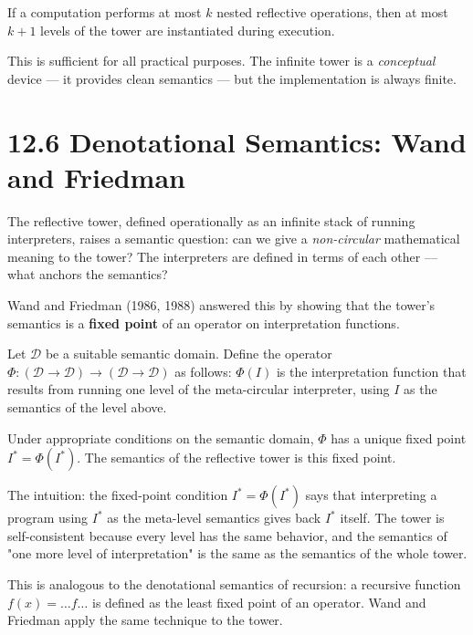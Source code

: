 \begin{proposition}
If a computation performs at most $k$ nested reflective operations, then at most $k + 1$ levels of the tower are instantiated during execution.

This is sufficient for all practical purposes. The infinite tower is a \textit{conceptual} device --- it provides clean semantics --- but the implementation is always finite.
\end{proposition}

\section{12.6 Denotational Semantics: Wand and Friedman}

The reflective tower, defined operationally as an infinite stack of running interpreters, raises a semantic question: can we give a \textit{non-circular} mathematical meaning to the tower? The interpreters are defined in terms of each other --- what anchors the semantics?

Wand and Friedman (1986, 1988) answered this by showing that the tower's semantics is a \textbf{fixed point} of an operator on interpretation functions.

\begin{definition}
Let $\mathcal{D}$ be a suitable semantic domain. Define the operator $\Phi: (\mathcal{D} \to \mathcal{D}) \to (\mathcal{D} \to \mathcal{D})$ as follows: $\Phi(I)$ is the interpretation function that results from running one level of the meta-circular interpreter, using $I$ as the semantics of the level above.
\end{definition}

\begin{theorem}
Under appropriate conditions on the semantic domain, $\Phi$ has a unique fixed point $I^* = \Phi(I^*)$. The semantics of the reflective tower is this fixed point.

The intuition: the fixed-point condition $I^* = \Phi(I^*)$ says that interpreting a program using $I^*$ as the meta-level semantics gives back $I^*$ itself. The tower is self-consistent because every level has the same behavior, and the semantics of "one more level of interpretation" is the same as the semantics of the whole tower.

This is analogous to the denotational semantics of recursion: a recursive function $f(x) = \ldots f \ldots$ is defined as the least fixed point of an operator. Wand and Friedman apply the same technique to the tower.
\end{theorem}

